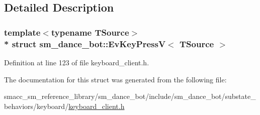 \subsection{Detailed Description}
\subsubsection*{template$<$typename T\+Source$>$\\*
struct sm\+\_\+dance\+\_\+bot\+::\+Ev\+Key\+Press\+V$<$ T\+Source $>$}



Definition at line 123 of file keyboard\+\_\+client.\+h.



The documentation for this struct was generated from the following file\+:\begin{DoxyCompactItemize}
\item 
smacc\+\_\+sm\+\_\+reference\+\_\+library/sm\+\_\+dance\+\_\+bot/include/sm\+\_\+dance\+\_\+bot/substate\+\_\+behaviors/keyboard/\hyperlink{keyboard__client_8h}{keyboard\+\_\+client.\+h}\end{DoxyCompactItemize}

